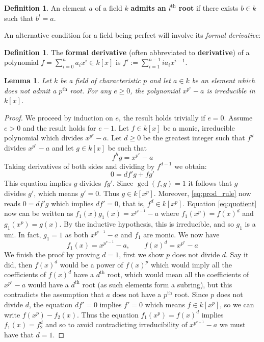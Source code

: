 \documentclass[12pt]{article}
\theoremstyle{plain}
\newtheorem{lemma}[thm]{Lemma}
\theoremstyle{definition}
\newtheorem{defn}[thm]{Definition} %
\begin{document}
%
\begin{defn}
\label{def:pthroot}
An element $a$ of a field $k$ \textbf{admits an $l^{\operatorname{th}}$ root} if there exists $b \in k$ such that $b^l = a$.
\end{defn}
%
An alternative condition for a field being perfect will involve its \emph{formal derivative}:
\begin{defn}
The \textbf{formal derivative} (often abbreviated to \textbf{derivative}) of a polynomial $f = \sum_{i = 0}^n a_i x^i \in k[x]$ is $f' := \sum_{i = 1}^{n-1} ia_ix^{i-1}$.
\end{defn}
\begin{lemma}
\label{lem:irred_example}
Let $k$ be a field of characteristic $p$ and let $a \in k$ be an element which does not admit a $p^\text{th}$ root. For any $e \geq 0$, the polynomial $x^{p^e} - a$ is irreducible in $k[x]$.
\end{lemma}
\begin{proof}
We proceed by induction on $e$, the result holds trivially if $e = 0$. Assume $e > 0$ and the result holds for $e-1$. Let $f \in k[x]$ be a monic, irreducible polynomial which divides $x^{p^e} - a$. Let $d \geq 0$ be the greatest integer such that $f^d$ divides $x^{p^e} - a$ and let $g \in k[x]$ be such that 
\begin{equation}
\label{eq:quotient}
f^h g = x^{p^e} - a
\end{equation}
Taking derivatives of both sides and dividing by $f^{d-1}$ we obtain:
\begin{equation}
\label{eq:prod_rule}
0 = df'g + fg'
\end{equation}
This equation implies $g$ divides $fg'$. Since $\operatorname{gcd}(f,g) = 1$ it follows that $g$ divides $g'$, which means $g' = 0$. Thus $g \in k[x^p]$. Moreover, \eqref{eq:prod_rule} now reads $0 = df'g$ which implies $df' = 0$, that is, $f^d \in k[x^p]$. Equation \eqref{eq:quotient} now can be written as $f_1(x)g_1(x) = x^{p^{e-1}} - a$ where $f_1(x^p) = f(x)^d$ and $g_1(x^p) = g(x)$. By the inductive hypothesis, this is irreducible, and so $g_1$ is a uni. In fact, $g_1 = 1$ as both $x^{p^{e-1}} - a$ and $f_1$ are monic. We now have \[f_1(x) = x^{p^{e-1}} - a,\qquad f(x)^d = x^{p^e} - a\]
We finish the proof by proving $d = 1$, first we show $p$ does not divide $d$. Say it did, then $f(x)^d$ would be a power of $f(x)^p$ which would imply all the coefficients of $f(x)^d$ have a $d^{\operatorname{th}}$ root, which would mean all the coefficients of $x^{p^e} - a$ would have a $d^{\operatorname{th}}$ root (as such elements form a subring), but this contradicts the assumption that $a$ does not have a $p^{\operatorname{th}}$ root. Since $p$ does not divide $d$, the equation $df' = 0$ implies $f' = 0$ which means $f \in k[x^p]$, so we can write $f(x^p) - f_2(x)$. Thus the equation $f_1(x^p) = f(x)^d$ implies $f_1(x) = f_2^d$ and so to avoid contradicting irreducibility of $x^{p^{e-1}}-a$ we must have that $d = 1$.
\end{proof}
\end{document}
